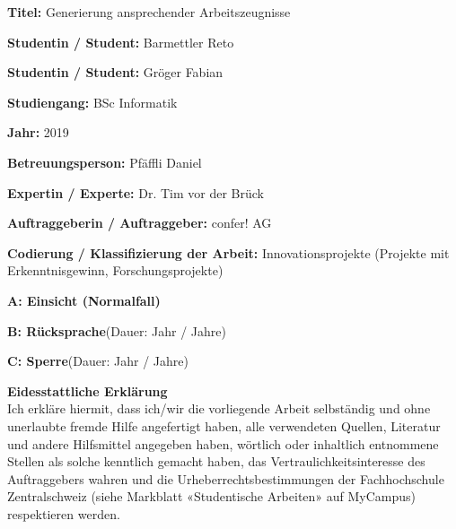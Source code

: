 \vspace{0.6cm}
\noindent
\textbf{Titel:} Generierung ansprechender Arbeitszeugnisse

\vspace{0.6cm}
\noindent
\textbf{Studentin / Student:} Barmettler Reto

\vspace{0.6cm}
\noindent
\textbf{Studentin / Student:} Gröger Fabian

\vspace{0.6cm}
\noindent
\textbf{Studiengang:} BSc Informatik

\vspace{0.6cm}
\noindent
\textbf{Jahr:} 2019

\vspace{0.6cm}
\noindent
\textbf{Betreuungsperson:} Pfäffli Daniel

\vspace{0.6cm}
\noindent
\textbf{Expertin / Experte:} Dr. Tim vor der Brück

\vspace{0.6cm}
\noindent
\textbf{Auftraggeberin / Auftraggeber:} confer! AG

\vspace*{1.00cm}

\noindent
\textbf{Codierung / Klassifizierung der Arbeit:} Innovationsprojekte (Projekte mit
Erkenntnisgewinn, Forschungsprojekte)

\begin{todolist}
	\item \textbf{A: Einsicht (Normalfall)}
	\item \textbf{B: Rücksprache}\hspace*{0.7cm}(Dauer:\hspace*{1cm} Jahr / Jahre)
	\item \textbf{C: Sperre}\hspace*{1.865cm}(Dauer:\hspace*{1cm} Jahr / Jahre)
\end{todolist}

\vspace*{1.00cm}

\noindent
\textbf{Eidesstattliche Erklärung}
\\
Ich erkläre hiermit, dass ich/wir die vorliegende Arbeit selbständig und ohne unerlaubte fremde Hilfe angefertigt haben, alle verwendeten Quellen, Literatur und andere Hilfsmittel angegeben haben, wörtlich oder inhaltlich entnommene Stellen als solche kenntlich gemacht haben, das Vertraulichkeitsinteresse des Auftraggebers wahren und die Urheberrechtsbestimmungen der Fachhochschule Zentralschweiz (siehe Markblatt «Studentische Arbeiten» auf MyCampus) respektieren werden.

